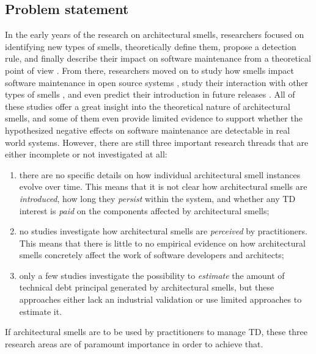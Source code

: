 \subsection{Problem statement}\label{sec:intro:problem-statement}
In the early years of the research on architectural smells, researchers focused on identifying new types of smells, theoretically define them, propose a detection rule, and finally describe their impact on software maintenance from a theoretical point of view \cite{Lippert2006,Garcia2009,Mo2015,Le2016,Arcelli2016}.
From there, researchers moved on to study how smells impact software maintenance in open source systems \cite{Choudhary2016,Xiao2016,Le2018}, study their interaction with other types of smells \cite{Sharma2017,Arcelli2019}, and even predict their introduction in future releases \cite{Arcelli2019b}.
All of these studies offer a great insight into the theoretical nature of architectural smells, and some of them even provide limited evidence to support whether the hypothesized negative effects on software maintenance are detectable in real world systems.
However, there are still three important research threads that are either incomplete or not investigated at all:
\begin{enumerate}
    \item there are no specific details on how individual architectural smell instances evolve over time. This means that it is not clear how architectural smells are \emph{introduced}, how long they \emph{persist} within the system, and whether any TD interest is \emph{paid} on the components affected by architectural smells; 
    
    \item no studies investigate how architectural smells are \emph{perceived} by practitioners. This means that there is little to no empirical evidence on how architectural smells concretely affect the work of software developers and architects;
    
    \item only a few studies investigate the possibility to \emph{estimate} the amount of technical debt principal generated by architectural smells, but these approaches either lack an industrial validation or use limited approaches to estimate it. 
\end{enumerate}
If architectural smells are to be used by practitioners to manage TD, these three research areas are of paramount importance in order to achieve that.

